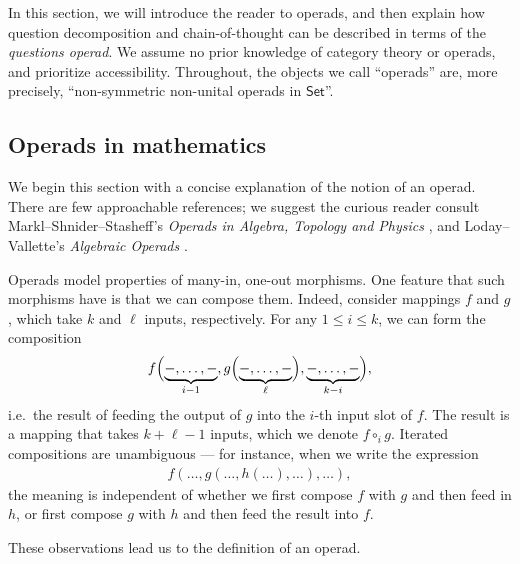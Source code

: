 \documentclass{article}
\theoremstyle{plain}
\theoremstyle{definition}
\theoremstyle{remark}
\theoremstyle{definition}
\newcommand{\Set}{\textsf{Set}}
\begin{document}
In this section, we will introduce the reader to operads, and then explain how question decomposition and chain-of-thought can be described in terms of the \emph{questions operad}.
We assume no prior knowledge of category theory or operads, and prioritize accessibility.
Throughout, the objects we call ``operads'' are, more precisely, ``non-symmetric non-unital operads in $\Set$''.

\subsection{Operads in mathematics}
\label{ss:operads_in_math}

We begin this section with a concise explanation of the notion of an operad.
There are few approachable references; we suggest the curious reader consult Markl--Shnider--Stasheff's {\it Operads in Algebra, Topology and Physics} \citep{markl_stasheff_shnider:operads_in_algebra_topology_and_physics}, and Loday--Vallette's {\it Algebraic Operads} \citep{loday_vallette:algebraic_operads}.

Operads model properties of many-in, one-out morphisms.
One feature that such morphisms have is that we can compose them.
Indeed, consider mappings $f$ and $g$, which take $k$ and $\ell$ inputs, respectively.
For any $1 \leq i \leq k$, we can form the composition
\begin{align}
\label{eq:function_composition}
f\Bigl(\underbrace{-,\ldots,-}_{i-1},g\Bigl(\underbrace{-,\ldots,-}_\ell\Bigr),\underbrace{-,\ldots,-}_{k-i}\Bigr),
\end{align}
i.e.\ the result of feeding the output of $g$ into the $i$-th input slot of $f$.
The result is a mapping that takes $k+\ell-1$ inputs, which we denote $f\circ_ig$.
Iterated compositions are unambiguous --- for instance, when we write the expression
\begin{align}
\label{eq:classical_assoc}
f(\ldots,g(\ldots,h(\ldots),\ldots),\ldots),
\end{align}
the meaning is independent of whether we first compose $f$ with $g$ and then feed in $h$, or first compose $g$ with $h$ and then feed the result into $f$.

These observations lead us to the definition of an operad.
\end{document}
